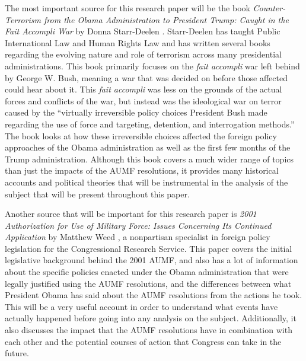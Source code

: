 \documentclass[12pt]{article}
\begin{document}
The most important source for this research paper will be the book \textit{Counter-Terrorism from the Obama Administration to President Trump: Caught in the Fait Accompli War} by Donna Starr-Deelen \autocite{starr-deelen2018}.
Starr-Deelen has taught Public International Law and Human Rights Law and has written several books regarding the evolving nature and role of terrorism across many presidential administrations.
This book primarily focuses on the \textit{fait accompli} war left behind by George W. Bush, meaning a war that was decided on before those affected could hear about it.
This \textit{fait accompli} was less on the grounds of the actual forces and conflicts of the war, but instead was the ideological war on terror caused by the ``virtually irreversible policy choices President Bush made regarding the use of force and targeting, detention, and interrogation methods.''\autocite[2]{starr-deelen2018}
The book looks at how these irreversible choices affected the foreign policy approaches of the Obama administration as well as the first few months of the Trump administration.
Although this book covers a much wider range of topics than just the impacts of the AUMF resolutions, it provides many historical accounts and political theories that will be instrumental in the analysis of the subject that will be present throughout this paper.

Another source that will be important for this research paper is \textit{2001 Authorization for Use of Military Force: Issues Concerning Its Continued Application} by Matthew Weed \autocite{weed2015}, a nonpartisan specialist in foreign policy legislation for the Congressional Research Service.
This paper covers the initial legislative background behind the 2001 AUMF, and also has a lot of information about the specific policies enacted under the Obama administration that were legally justified using the AUMF resolutions, and the differences between what President Obama has said about the AUMF resolutions from the actions he took.
This will be a very useful account in order to understand what events have actually happened before going into any analysis on the subject.
Additionally, it also discusses the impact that the AUMF resolutions have in combination with each other and the potential courses of action that Congress can take in the future.
\end{document}
